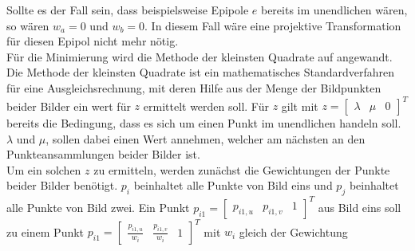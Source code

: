 
Sollte es der Fall sein, dass beispielsweise Epipole $e$ bereits im unendlichen wären, so wären $w_a = 0$ und $w_b = 0$. In diesem Fall wäre eine projektive Transformation für diesen Epipol nicht mehr nötig.\\

Für die Minimierung wird die Methode der kleinsten Quadrate auf angewandt. Die Methode der kleinsten Quadrate ist ein mathematisches Standardverfahren für eine Ausgleichsrechnung, mit deren Hilfe aus der Menge der Bildpunkten beider Bilder ein wert für $z$ ermittelt werden soll\cite{leastSquare}. Für $z$ gilt mit $z = \begin{bmatrix}\lambda&\mu&0\end{bmatrix}^T$ bereits die Bedingung, dass es sich um einen Punkt im unendlichen handeln soll. $\lambda$ und $\mu$, sollen dabei einen Wert annehmen, welcher am nächsten an den Punkteansammlungen beider Bilder ist. \\





%
%

Um ein solchen $z$ zu ermitteln, werden zunächst die Gewichtungen der Punkte beider Bilder benötigt. $p_i$ beinhaltet alle Punkte von Bild eins und $p_j$ beinhaltet alle Punkte von Bild zwei. Ein Punkt  $p_{i1} = \begin{bmatrix}p_{i1,u}&p_{i1,v}&1\end{bmatrix}^T$ aus Bild eins soll zu einem Punkt $p_{i1} = \begin{bmatrix}\frac{p_{i1,u}}{w_i}&\frac{p_{i1,v}}{w_i}&1\end{bmatrix}^T$ mit $w_i$ gleich der Gewichtung 

